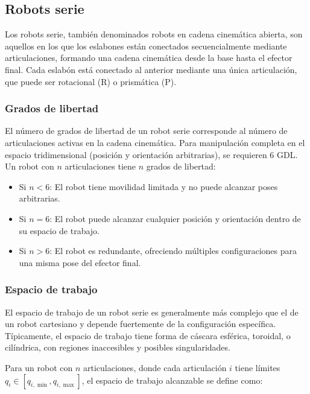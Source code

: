 \subsection{Robots serie}

Los robots serie, también denominados robots en cadena cinemática abierta, son aquellos en los que los eslabones están conectados secuencialmente mediante articulaciones, formando una cadena cinemática desde la base hasta el efector final. Cada eslabón está conectado al anterior mediante una única articulación, que puede ser rotacional (R) o prismática (P).

\subsubsection{Grados de libertad}

El número de grados de libertad de un robot serie corresponde al número de articulaciones activas en la cadena cinemática. Para manipulación completa en el espacio tridimensional (posición y orientación arbitrarias), se requieren 6 GDL. Un robot con $n$ articulaciones tiene $n$ grados de libertad:

\begin{itemize}[label=$\bullet$]
    \item Si $n < 6$: El robot tiene movilidad limitada y no puede alcanzar poses arbitrarias.
    \item Si $n = 6$: El robot puede alcanzar cualquier posición y orientación dentro de su espacio de trabajo.
    \item Si $n > 6$: El robot es redundante, ofreciendo múltiples configuraciones para una misma pose del efector final.
\end{itemize}

\subsubsection{Espacio de trabajo}

El espacio de trabajo de un robot serie es generalmente más complejo que el de un robot cartesiano y depende fuertemente de la configuración específica. Típicamente, el espacio de trabajo tiene forma de cáscara esférica, toroidal, o cilíndrica, con regiones inaccesibles y posibles singularidades.

Para un robot con $n$ articulaciones, donde cada articulación $i$ tiene límites $q_i \in [q_{i,\min}, q_{i,\max}]$, el espacio de trabajo alcanzable se define como:

